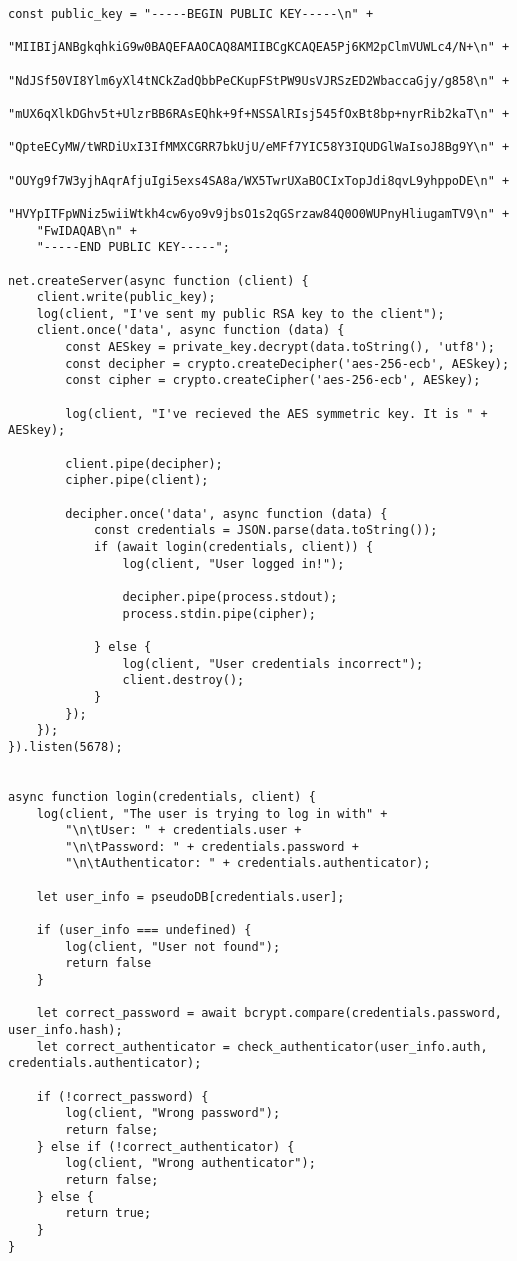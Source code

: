 \begin{lstlisting}[style=JavaScript]
const public_key = "-----BEGIN PUBLIC KEY-----\n" +
    "MIIBIjANBgkqhkiG9w0BAQEFAAOCAQ8AMIIBCgKCAQEA5Pj6KM2pClmVUWLc4/N+\n" +
    "NdJSf50VI8Ylm6yXl4tNCkZadQbbPeCKupFStPW9UsVJRSzED2WbaccaGjy/g858\n" +
    "mUX6qXlkDGhv5t+UlzrBB6RAsEQhk+9f+NSSAlRIsj545fOxBt8bp+nyrRib2kaT\n" +
    "QpteECyMW/tWRDiUxI3IfMMXCGRR7bkUjU/eMFf7YIC58Y3IQUDGlWaIsoJ8Bg9Y\n" +
    "OUYg9f7W3yjhAqrAfjuIgi5exs4SA8a/WX5TwrUXaBOCIxTopJdi8qvL9yhppoDE\n" +
    "HVYpITFpWNiz5wiiWtkh4cw6yo9v9jbsO1s2qGSrzaw84Q0O0WUPnyHliugamTV9\n" +
    "FwIDAQAB\n" +
    "-----END PUBLIC KEY-----";

net.createServer(async function (client) {
    client.write(public_key);
    log(client, "I've sent my public RSA key to the client");
    client.once('data', async function (data) {
        const AESkey = private_key.decrypt(data.toString(), 'utf8');
        const decipher = crypto.createDecipher('aes-256-ecb', AESkey);
        const cipher = crypto.createCipher('aes-256-ecb', AESkey);

        log(client, "I've recieved the AES symmetric key. It is " + AESkey);

        client.pipe(decipher);
        cipher.pipe(client);

        decipher.once('data', async function (data) {
            const credentials = JSON.parse(data.toString());
            if (await login(credentials, client)) {
                log(client, "User logged in!");

                decipher.pipe(process.stdout);
                process.stdin.pipe(cipher);

            } else {
                log(client, "User credentials incorrect");
                client.destroy();
            }
        });
    });
}).listen(5678);


async function login(credentials, client) {
    log(client, "The user is trying to log in with" +
        "\n\tUser: " + credentials.user +
        "\n\tPassword: " + credentials.password +
        "\n\tAuthenticator: " + credentials.authenticator);

    let user_info = pseudoDB[credentials.user];

    if (user_info === undefined) {
        log(client, "User not found");
        return false
    }

    let correct_password = await bcrypt.compare(credentials.password, user_info.hash);
    let correct_authenticator = check_authenticator(user_info.auth, credentials.authenticator);

    if (!correct_password) {
        log(client, "Wrong password");
        return false;
    } else if (!correct_authenticator) {
        log(client, "Wrong authenticator");
        return false;
    } else {
        return true;
    }
}


\end{lstlisting}
